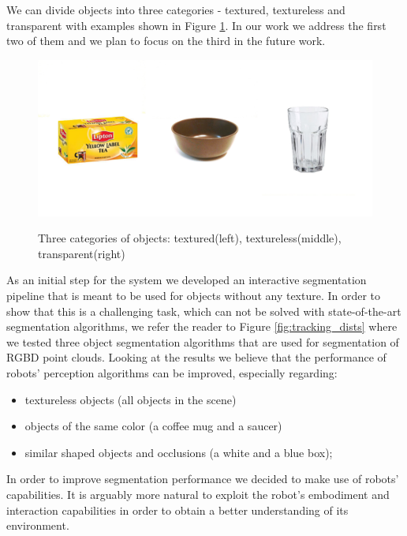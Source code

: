 	
We can divide objects into three categories - textured, textureless and transparent with examples shown in Figure \ref{fig:all-objects}. In our work we address the first two of them and we plan to focus on the third in the future work.

\begin{figure}

{\includegraphics[width=1\columnwidth]{figures/all-objects.jpg}}

\caption{Three categories of objects: textured(left), textureless(middle), transparent(right)}
\label{fig:all-objects}
\end{figure}

As an initial step for the system we developed an interactive segmentation pipeline that is meant to be used for objects without any texture. In order to show that this is a challenging task, which can not be solved with state-of-the-art segmentation algorithms, we refer the reader to Figure \ref{fig:tracking_dists} where we tested three object segmentation algorithms that are used for segmentation of RGBD point clouds. Looking at the results we believe that the performance of robots' perception algorithms can be improved, especially regarding: 

\begin{itemize} 
\item textureless objects (all objects in the scene)
\item objects of the same color (a coffee mug and a saucer)
\item similar shaped objects and occlusions (a white and a blue box);
\end{itemize}


In order to improve segmentation performance we decided to make use of robots'
capabilities. It is arguably more natural to exploit the robot's embodiment
and interaction capabilities in order to obtain a better understanding of its environment.

